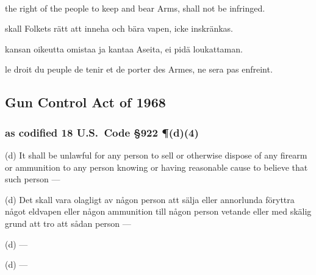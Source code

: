 \documentclass[a4,landscape,12pt]{article}
\begin{document}
~

\begin{minipage}[t]{0.22\textwidth}
the right of the people to keep and bear Arms, shall not be infringed.
\end{minipage}\textwidth
\begin{minipage}[t]{0.22\textwidth}
skall Folkets rätt att inneha och bära vapen, icke inskränkas.
\end{minipage}\textwidth
\begin{minipage}[t]{0.22\textwidth}
kansan oikeutta omistaa ja kantaa Aseita, ei pidä loukattaman.
\end{minipage}\textwidth
\begin{minipage}[t]{0.22\textwidth}
le droit du peuple de tenir et de porter des Armes, ne sera pas enfreint.
\end{minipage}

\subsection*{Gun Control Act of 1968}

\subsubsection*{as codified 18 U.S.~Code \S 922 \P(d)(4)}

\begin{minipage}[t]{0.22\textwidth}
(d) It shall be unlawful for any person to sell or otherwise dispose of any firearm or ammunition to any person knowing or having reasonable cause to believe that such person ---
\end{minipage}\textwidth
\begin{minipage}[t]{0.22\textwidth}
(d) Det skall vara olagligt av någon person att sälja eller annorlunda föryttra något eldvapen eller någon ammunition till någon person vetande eller med skälig grund att tro att sådan person ---
\end{minipage}\textwidth
\begin{minipage}[t]{0.22\textwidth}
(d) ---
\end{minipage}\textwidth
\begin{minipage}[t]{0.22\textwidth}
(d) ---
\end{minipage}
\end{document}
